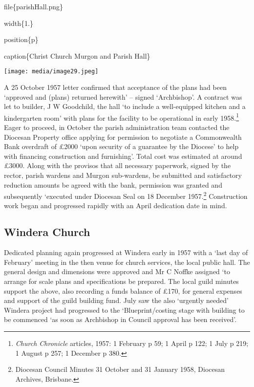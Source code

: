 file\{parishHall.png\}

width\{1.\}

position\{p\}

caption\{Christ Church Murgon and Parish Hall\}

\texttt{[image: media/image29.jpeg]}

A 25 October 1957 letter confirmed that acceptance of the plans had been `approved and (plans) returned herewith' -- signed `Archbishop'. A contract was let to builder, J W Goodchild, the hall `to include a well-equipped kitchen and a kindergarten room' with plans for the facility to be operational in early 1958.\footnote{\emph{Church Chronicle} articles, 1957: 1 February p 59; 1 April p 122; 1 July p 219; 1 August p 257; 1 December p 380.} Eager to proceed, in October the parish administration team contacted the Diocesan Property office applying for permission to negotiate a Commonwealth Bank overdraft of £2000 `upon security of a guarantee by the Diocese' to help with financing construction and furnishing'. Total cost was estimated at around £3000. Along with the provisos that all necessary paperwork, signed by the rector, parish wardens and Murgon sub-wardens, be submitted and satisfactory reduction amounts be agreed with the bank, permission was granted and subsequently `executed under Diocesan Seal on 18 December 1957.\footnote{Diocesan Council Minutes 31 October and 31 January 1958, Diocesan Archives, Brisbane.} Construction work began and progressed rapidly with an April dedication date in mind.

\hypertarget{windera-church}{%
\subsection{Windera Church}\label{windera-church}}

Dedicated planning again progressed at Windera early in 1957 with a `last day of February' meeting in the then venue for church services, the local public hall. The general design and dimensions were approved and Mr C Noffke assigned `to arrange for scale plans and specifications be prepared. The local guild minutes support the above, also recording a funds balance of £170, for general expenses and support of the guild building fund. July saw the also `urgently needed' Windera project had progressed to the `Blueprint/costing stage with building to be commenced `as soon as Archbishop in Council approval has been received'.

